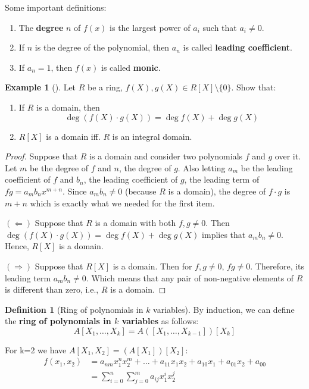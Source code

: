 \documentclass[12pt,a4paper]{article}
\theoremstyle{definition}
\newtheorem{example}{Example}[section]
\newtheorem{definition}{Definition}[section]
\begin{document}
Some important definitions:
\begin{enumerate}
\item The \textbf{degree} $n$ of $f(x)$ is the largest power of $a_i$ such that $a_i \neq 0$.  
\item If $n$ is the degree of the polynomial, then $a_n$ is called \textbf{leading coefficient}. 
\item If $a_n = 1$, then $f(x)$ is called \textbf{monic}.
\end{enumerate}

\begin{example}[]
Let $R$ be a ring, $f(X), g(X) \in R[X] \setminus \{ 0 \}$. Show that:
\begin{enumerate}
\item If $R$ is a domain, then 
\[
\deg(f(X) \cdot g(X)) = \deg f(X) + \deg g(X)
\]
\item $R[X]$ is a domain iff. $R$ is an integral domain.
\end{enumerate}
\end{example}

\begin{proof}
Suppose that $R$ is a domain and consider two polynomials $f$ and $g$ over it. Let $m$ be the degree of $f$ and $n$, the degree of $g$. Also letting $a_m$ be the leading coefficient of $f$ and $b_n$, the leading coefficient of $g$, the leading term of $fg = a_m b_n x^{m+n}$. Since $a_m b_n \neq 0$ (because $R$ is a domain), the degree of $f \cdot g$ is $m+n$ which is exactly what we needed for the first item.

$(\Leftarrow)$ Suppose that $R$ is a domain with both $f, g \neq 0$. Then $\deg(f(X) \cdot g(X)) = \deg f(X) + \deg g(X)$ implies that $a_m b_n \neq 0$. Hence, $R[X]$ is a domain.

$(\Rightarrow)$ Suppose that $R[X]$ is a domain. Then for $f, g \neq 0$, $fg \neq 0$. Therefore, its leading term $a_m b_n \neq 0$. Which means that any pair of non-negative elements of $R$ is different than zero, i.e., $R$ is a domain.
\end{proof}

\begin{definition}[Ring of polynomials in $k$ variables]
By induction, we can define the \textbf{ring of polynomials in $k$ variables} as follows:
\[
A[X_1,\ldots,X_k] = A([X_1,\ldots,X_{k-1}])[X_k]
\]
\end{definition}

For k=2 we have $A[X_1,X_2] = (A[X_1])[X_2]$:
\begin{equation*}
\begin{aligned}
f(x_1,x_2) & = a_{nm}x_1^{n} x_2^{m} + \ldots + a_{11}x_1 x_2 + a_{10}x_1 + a_{01}x_2 + a_{00} \\
& = \sum_{i=0}^n \sum_{j=0}^m a_{ij} x_1^i x_2^j
\end{aligned}
\end{equation*}
\end{document}
